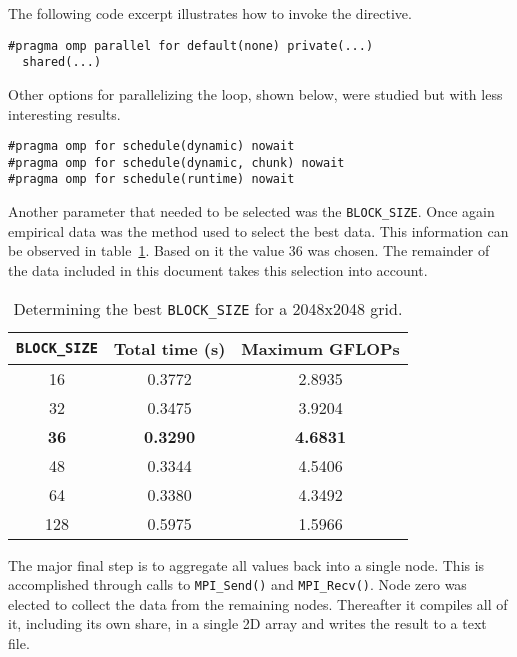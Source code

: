 The following code excerpt illustrates how to invoke the directive.
\begin{lstlisting}
#pragma omp parallel for default(none) private(...)
  shared(...)
\end{lstlisting}

Other options for parallelizing the loop, shown below, were studied but with less interesting results.

\begin{lstlisting}
#pragma omp for schedule(dynamic) nowait
#pragma omp for schedule(dynamic, chunk) nowait
#pragma omp for schedule(runtime) nowait
\end{lstlisting}

Another parameter that needed to be selected was the \texttt{BLOCK\_SIZE}. Once again empirical data was the method used to select the best data. This information can be observed in table~\ref{tbl:omp}. Based on it the value 36 was chosen. The remainder of the data included in this document takes this selection into account.


\begin{table}[H]
\centering
\begin{tabular}{*{3}{c}}
 \toprule
\texttt{BLOCK\_SIZE} &   Total time (\si{s}) &  Maximum GFLOPs   \\ \midrule
16                   &   0.3772              &  2.8935           \\
32                   &   0.3475              &  3.9204           \\
\bf 36               &   \bf 0.3290          &  \bf 4.6831       \\
48                   &   0.3344              &  4.5406           \\
64                   &   0.3380              &  4.3492           \\
128                  &   0.5975              &  1.5966           \\
\bottomrule
\end{tabular}
\caption{Determining the best \texttt{BLOCK\_SIZE} for a 2048x2048 grid.}
\label{tbl:omp}
\end{table}


The major final step is to aggregate all values back into a single node. This is accomplished through calls to \texttt{MPI\_Send()} and \texttt{MPI\_Recv()}.
Node zero was elected to collect the data from the remaining nodes. Thereafter it compiles all of it, including its own share, in a single 2D array and writes the result to a text file.

